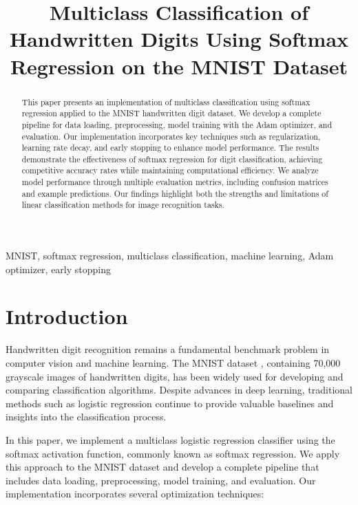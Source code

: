 \documentclass[10pt,journal,compsoc]{IEEEtran}
\begin{document}
\title{Multiclass Classification of Handwritten Digits Using Softmax Regression on the MNIST Dataset}

\author{
}

\maketitle

\begin{abstract}
This paper presents an implementation of multiclass classification using softmax regression applied to the MNIST handwritten digit dataset. We develop a complete pipeline for data loading, preprocessing, model training with the Adam optimizer, and evaluation. Our implementation incorporates key techniques such as regularization, learning rate decay, and early stopping to enhance model performance. The results demonstrate the effectiveness of softmax regression for digit classification, achieving competitive accuracy rates while maintaining computational efficiency. We analyze model performance through multiple evaluation metrics, including confusion matrices and example predictions. Our findings highlight both the strengths and limitations of linear classification methods for image recognition tasks.
\end{abstract}

\begin{IEEEkeywords}
MNIST, softmax regression, multiclass classification, machine learning, Adam optimizer, early stopping
\end{IEEEkeywords}

\section{Introduction}
Handwritten digit recognition remains a fundamental benchmark problem in computer vision and machine learning. The MNIST dataset \cite{lecun1998gradient}, containing 70,000 grayscale images of handwritten digits, has been widely used for developing and comparing classification algorithms. Despite advances in deep learning, traditional methods such as logistic regression continue to provide valuable baselines and insights into the classification process.

In this paper, we implement a multiclass logistic regression classifier using the softmax activation function, commonly known as softmax regression. We apply this approach to the MNIST dataset and develop a complete pipeline that includes data loading, preprocessing, model training, and evaluation. Our implementation incorporates several optimization techniques:
\end{document}
